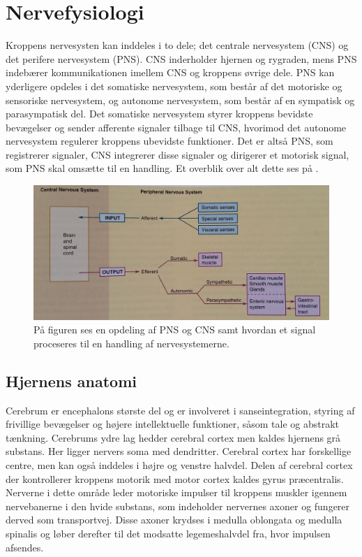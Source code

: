\chapter{Nervefysiologi}\label{AppNerve}
Kroppens nervesysten kan inddeles i to dele; det centrale nervesystem (CNS) og det perifere nervesystem (PNS). CNS inderholder hjernen og rygraden, mens PNS indebærer kommunikationen imellem CNS og kroppens øvrige dele. PNS kan yderligere opdeles i det somatiske nervesystem, som består af det motoriske og sensoriske nervesystem, og autonome nervesystem, som består af en sympatisk og parasympatisk del. Det somatiske nervesystem styrer kroppens bevidste bevægelser og sender afferente signaler tilbage til CNS, hvorimod det autonome nervesystem regulerer kroppens ubevidste funktioner. Det er altså PNS, som registrerer signaler, CNS integrerer disse signaler og dirigerer et motorisk signal, som PNS skal omsætte til en handling. \cite{Martini2012,Stanfield2014} Et overblik over alt dette ses på .

\begin{figure}[H]
	\centering
	\includegraphics[scale=0.4]{figures/bProblemanalyse/Nervesys1.jpg}
	\caption{På figuren ses en opdeling af PNS og CNS samt hvordan et signal proceseres til en handling af nervesystemerne. \cite{Stanfield2014}}
	\label{Nersys}
\end{figure}

\section{Hjernens anatomi}
Cerebrum er encephalons største del og er involveret i sanseintegration, styring af frivillige bevægelser og højere intellektuelle funktioner, såsom tale og abstrakt tænkning. \cite{Academic2015b} Cerebrums ydre lag hedder cerebral cortex men kaldes hjernens grå substans. Her ligger nervers soma med dendritter. Cerebral cortex har forskellige centre, men kan også inddeles i højre og venstre halvdel. Delen af cerebral cortex der kontrollerer kroppens motorik med motor cortex kaldes gyrus præcentralis. Nerverne i dette område leder motoriske impulser til kroppens muskler igennem nervebanerne i den hvide substans, som indeholder nervernes axoner og fungerer derved som transportvej. \cite{Academic2015b,Martini2012,Stanfield2014} Disse axoner krydses i medulla oblongata og medulla spinalis og løber derefter til det modsatte legemeshalvdel fra, hvor impulsen afsendes. \cite{Martini2012}

